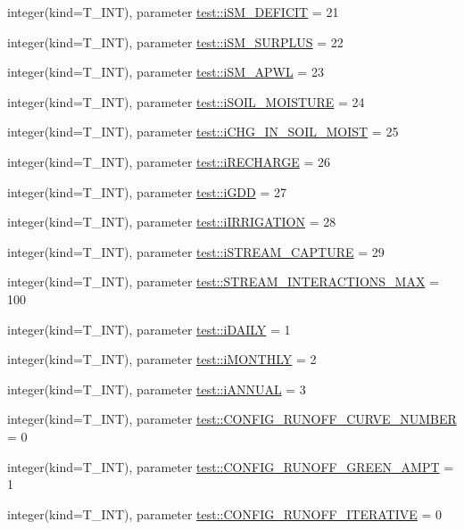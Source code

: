 \begin{DoxyCompactItemize}
\item 
integer(kind=T\_\-INT), parameter \hyperlink{namespacetest_a383b6fea0fe65ad1c1832ef3f5922070}{test::iSM\_\-DEFICIT} = 21
\item 
integer(kind=T\_\-INT), parameter \hyperlink{namespacetest_a9efe22e7483171c67675c69e02b3f2c4}{test::iSM\_\-SURPLUS} = 22
\item 
integer(kind=T\_\-INT), parameter \hyperlink{namespacetest_a575084634243635f2b95f243548de016}{test::iSM\_\-APWL} = 23
\item 
integer(kind=T\_\-INT), parameter \hyperlink{namespacetest_af695837c4d2bfcaa32ecc407aad09776}{test::iSOIL\_\-MOISTURE} = 24
\item 
integer(kind=T\_\-INT), parameter \hyperlink{namespacetest_a93ab61cb59cc0d1c60ad3b8d26b070ff}{test::iCHG\_\-IN\_\-SOIL\_\-MOIST} = 25
\item 
integer(kind=T\_\-INT), parameter \hyperlink{namespacetest_a7cbbcc7ca182caf51d3afe6c583ee71b}{test::iRECHARGE} = 26
\item 
integer(kind=T\_\-INT), parameter \hyperlink{namespacetest_a488c52f0f7220cd4e5dfd202048bc6dd}{test::iGDD} = 27
\item 
integer(kind=T\_\-INT), parameter \hyperlink{namespacetest_a5143d96a60fefdc2b8959e8e0b99661b}{test::iIRRIGATION} = 28
\item 
integer(kind=T\_\-INT), parameter \hyperlink{namespacetest_a6dc6983b645899b34f357412d47018c5}{test::iSTREAM\_\-CAPTURE} = 29
\item 
integer(kind=T\_\-INT), parameter \hyperlink{namespacetest_ad3936bf03ae58d097cb5b10ed2afead6}{test::STREAM\_\-INTERACTIONS\_\-MAX} = 100
\item 
integer(kind=T\_\-INT), parameter \hyperlink{namespacetest_a48081398f90bec0222d878b534da1320}{test::iDAILY} = 1
\item 
integer(kind=T\_\-INT), parameter \hyperlink{namespacetest_ae6a20a8c4dbaebffde9b9b7c933237b4}{test::iMONTHLY} = 2
\item 
integer(kind=T\_\-INT), parameter \hyperlink{namespacetest_a952527c86ef64f1bf77dc314ac43c14e}{test::iANNUAL} = 3
\item 
integer(kind=T\_\-INT), parameter \hyperlink{namespacetest_aa4c0a351964701262a252e1174d8959c}{test::CONFIG\_\-RUNOFF\_\-CURVE\_\-NUMBER} = 0
\item 
integer(kind=T\_\-INT), parameter \hyperlink{namespacetest_aaef68858ea9447158dabcb1edc0bc51c}{test::CONFIG\_\-RUNOFF\_\-GREEN\_\-AMPT} = 1
\item 
integer(kind=T\_\-INT), parameter \hyperlink{namespacetest_a7359910b1beaefb9b4c414836e39093b}{test::CONFIG\_\-RUNOFF\_\-ITERATIVE} = 0

\end{DoxyCompactItemize}
